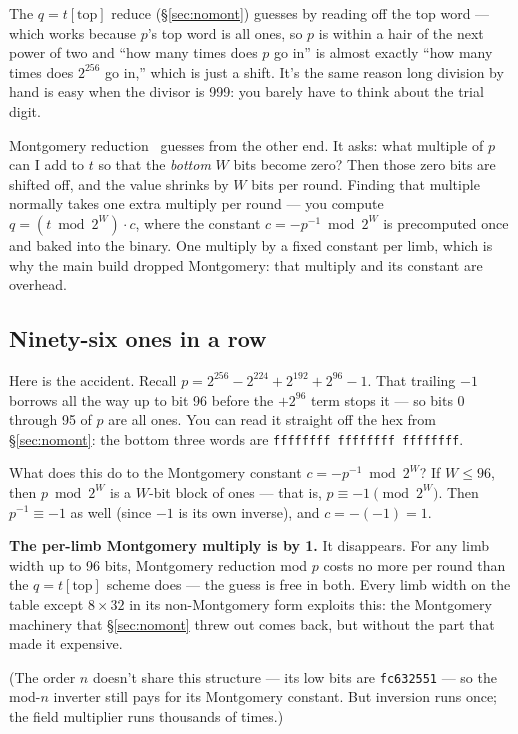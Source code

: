 \documentclass[11pt,a4paper]{article}
\begin{document}
The $q=t[\text{top}]$ reduce (\S\ref{sec:nomont}) guesses by reading
off the top word --- which works because $p$'s top word is all ones,
so $p$ is within a hair of the next power of two and ``how many
times does $p$ go in'' is almost exactly ``how many times does
$2^{256}$ go in,'' which is just a shift. It's the same reason long
division by hand is easy when the divisor is 999: you barely have to
think about the trial digit.

Montgomery reduction~\cite{montgomery} guesses from the other end.
It asks: what multiple of $p$ can I add to $t$ so that the
\emph{bottom} $W$ bits become zero? Then those zero bits are shifted
off, and the value shrinks by $W$ bits per round. Finding that
multiple normally takes one extra multiply per round --- you compute
$q = (t \bmod 2^W) \cdot c$, where the constant $c = -p^{-1} \bmod
2^W$ is precomputed once and baked into the binary. One multiply by a
fixed constant per limb, which is why the main build dropped
Montgomery: that multiply and its constant are overhead.

\subsection{Ninety-six ones in a row}

Here is the accident. Recall $p = 2^{256} - 2^{224} + 2^{192} +
2^{96} - 1$. That trailing $-1$ borrows all the way up to bit 96
before the $+2^{96}$ term stops it --- so bits 0 through 95 of $p$
are all ones. You can read it straight off the hex from
\S\ref{sec:nomont}: the bottom three words are
\texttt{ffffffff\,ffffffff\,ffffffff}.

What does this do to the Montgomery constant $c = -p^{-1} \bmod 2^W$?
If $W \le 96$, then $p \bmod 2^W$ is a $W$-bit block of ones --- that
is, $p \equiv -1 \pmod{2^W}$. Then $p^{-1} \equiv -1$ as well (since
$-1$ is its own inverse), and $c = -(-1) = 1$.

\textbf{The per-limb Montgomery multiply is by 1.} It disappears. For
any limb width up to 96 bits, Montgomery reduction mod $p$ costs no
more per round than the $q=t[\text{top}]$ scheme does --- the guess
is free in both. Every limb width on the table except $8 \times 32$
in its non-Montgomery form exploits this: the Montgomery machinery
that \S\ref{sec:nomont} threw out comes back, but without the part
that made it expensive.

(The order $n$ doesn't share this structure --- its low bits are
\texttt{fc632551} --- so the mod-$n$ inverter still pays for its
Montgomery constant. But inversion runs once; the field multiplier
runs thousands of times.)
\end{document}
